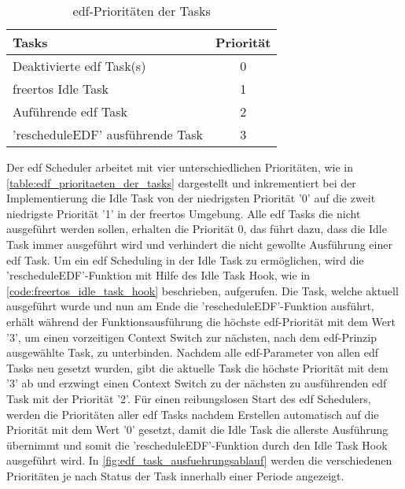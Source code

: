 \documentclass[../EDF Master Thesis.tex]{subfiles}
\begin{document}
    \begin{table}[ht!]
        \centering
        \begin{tabular}{l|c}
            Tasks & Priorität \\
            \hline
            Deaktivierte \ac{edf} Task(s) & 0\\
            \ac{freertos} Idle Task & 1\\
            Auführende \ac{edf} Task & 2\\
            'rescheduleEDF' ausführende Task & 3
        \end{tabular}
        \caption{\ac{edf}-Prioritäten der Tasks}
        \label{table:edf_prioritaeten_der_tasks}
    \end{table}

    Der \ac{edf} Scheduler arbeitet mit vier unterschiedlichen Prioritäten, wie in \autoref{table:edf_prioritaeten_der_tasks} dargestellt und inkrementiert bei der Implementierung die Idle Task von der niedrigsten Priorität '0' auf die zweit niedrigste Priorität '1' in der \ac{freertos} Umgebung.
    Alle \ac{edf} Tasks die nicht ausgeführt werden sollen, erhalten die Priorität 0, das führt dazu, dass die Idle Task immer ausgeführt wird und verhindert die nicht gewollte Ausführung einer \ac{edf} Task.
    Um ein \ac{edf} Scheduling in der Idle Task zu ermöglichen, wird die 'rescheduleEDF'-Funktion mit Hilfe des Idle Task Hook, wie in \autoref{code:freertos_idle_task_hook} beschrieben, aufgerufen.
    Die Task, welche aktuell ausgeführt wurde und nun am Ende die 'rescheduleEDF'-Funktion ausführt, erhält während der Funktionsausführung die höchste \ac{edf}-Priorität mit dem Wert '3', um einen vorzeitigen Context Switch zur nächsten, nach dem \ac{edf}-Prinzip ausgewählte Task, zu unterbinden.
    Nachdem alle \ac{edf}-Parameter von allen \ac{edf} Tasks neu gesetzt wurden, gibt die aktuelle Task die höchste Priorität mit dem '3' ab und erzwingt einen Context Switch zu der nächsten zu ausführenden \ac{edf} Task mit der Priorität '2'.
    Für einen reibungslosen Start des \ac{edf} Schedulers, werden die Prioritäten aller \ac{edf} Tasks nachdem Erstellen automatisch auf die Priorität mit dem Wert '0' gesetzt, damit die Idle Task die allerste Ausführung übernimmt und somit die 'rescheduleEDF'-Funktion durch den Idle Task Hook ausgeführt wird.
    In \autoref{fig:edf_task_ausfuehrungsablauf} werden die verschiedenen Prioritäten je nach Status der Task innerhalb einer Periode angezeigt.
    
\end{document}
